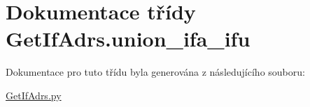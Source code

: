 \hypertarget{classGetIfAdrs_1_1union__ifa__ifu}{\section{Dokumentace třídy Get\-If\-Adrs.\-union\-\_\-ifa\-\_\-ifu}
\label{d6/d8e/classGetIfAdrs_1_1union__ifa__ifu}
}


Dokumentace pro tuto třídu byla generována z následujícího souboru\-:\begin{DoxyCompactItemize}
\item 
\hyperlink{GetIfAdrs_8py}{Get\-If\-Adrs.\-py}\end{DoxyCompactItemize}
